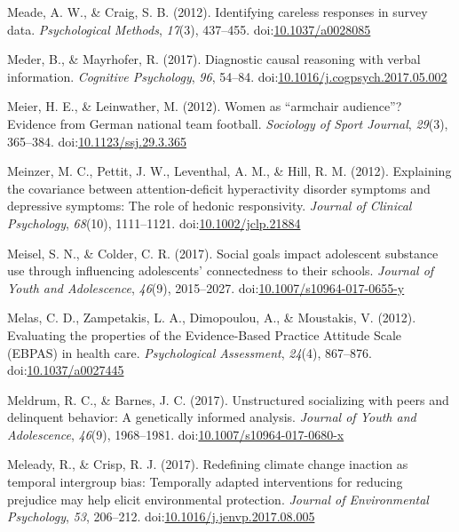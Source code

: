 \documentclass[english,man]{apa6}
\theoremstyle{definition}
\theoremstyle{definition}
\theoremstyle{definition}
\theoremstyle{remark}
\begin{document}
\hypertarget{ref-Meade2012}{}
Meade, A. W., \& Craig, S. B. (2012). Identifying careless responses in
survey data. \emph{Psychological Methods}, \emph{17}(3), 437--455.
doi:\href{https://doi.org/10.1037/a0028085}{10.1037/a0028085}

\hypertarget{ref-Meder2017}{}
Meder, B., \& Mayrhofer, R. (2017). Diagnostic causal reasoning with
verbal information. \emph{Cognitive Psychology}, \emph{96}, 54--84.
doi:\href{https://doi.org/10.1016/j.cogpsych.2017.05.002}{10.1016/j.cogpsych.2017.05.002}

\hypertarget{ref-Meier2012}{}
Meier, H. E., \& Leinwather, M. (2012). Women as ``armchair audience''?
Evidence from German national team football. \emph{Sociology of Sport
Journal}, \emph{29}(3), 365--384.
doi:\href{https://doi.org/10.1123/ssj.29.3.365}{10.1123/ssj.29.3.365}

\hypertarget{ref-Meinzer2012}{}
Meinzer, M. C., Pettit, J. W., Leventhal, A. M., \& Hill, R. M. (2012).
Explaining the covariance between attention-deficit hyperactivity
disorder symptoms and depressive symptoms: The role of hedonic
responsivity. \emph{Journal of Clinical Psychology}, \emph{68}(10),
1111--1121.
doi:\href{https://doi.org/10.1002/jclp.21884}{10.1002/jclp.21884}

\hypertarget{ref-Meisel2017}{}
Meisel, S. N., \& Colder, C. R. (2017). Social goals impact adolescent
substance use through influencing adolescents' connectedness to their
schools. \emph{Journal of Youth and Adolescence}, \emph{46}(9),
2015--2027.
doi:\href{https://doi.org/10.1007/s10964-017-0655-y}{10.1007/s10964-017-0655-y}

\hypertarget{ref-Melas2012}{}
Melas, C. D., Zampetakis, L. A., Dimopoulou, A., \& Moustakis, V.
(2012). Evaluating the properties of the Evidence-Based Practice
Attitude Scale (EBPAS) in health care. \emph{Psychological Assessment},
\emph{24}(4), 867--876.
doi:\href{https://doi.org/10.1037/a0027445}{10.1037/a0027445}

\hypertarget{ref-Meldrum2017}{}
Meldrum, R. C., \& Barnes, J. C. (2017). Unstructured socializing with
peers and delinquent behavior: A genetically informed analysis.
\emph{Journal of Youth and Adolescence}, \emph{46}(9), 1968--1981.
doi:\href{https://doi.org/10.1007/s10964-017-0680-x}{10.1007/s10964-017-0680-x}

\hypertarget{ref-Meleady2017}{}
Meleady, R., \& Crisp, R. J. (2017). Redefining climate change inaction
as temporal intergroup bias: Temporally adapted interventions for
reducing prejudice may help elicit environmental protection.
\emph{Journal of Environmental Psychology}, \emph{53}, 206--212.
doi:\href{https://doi.org/10.1016/j.jenvp.2017.08.005}{10.1016/j.jenvp.2017.08.005}
\end{document}
